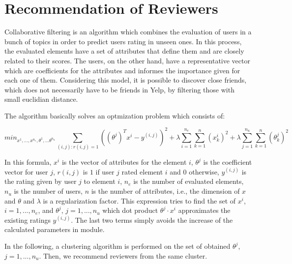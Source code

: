 \section{Recommendation of Reviewers}
Collaborative filtering is an algorithm which combines the evaluation of
users in a bunch of topics in order to predict users rating in unseen ones. In
this process, the evaluated elements have a set of attributes that define them
and are closely related to their scores. The users, on the other hand, have a
representative vector which are coefficients for the attributes and informes the
importance given for each one of them. Considering this model, it is possible to
discover close friends, which does not necessarily have to be friends in Yelp,
by filtering those with small euclidian distance.

The algorithm basically solves an optmization problem which consists of:

\[
min_{x^1,...,x^{n_e},\theta^1,...\theta^{n_u}}
  \sum_{(i,j):r(i,j)=1} ((\theta^j)^T x^i - y^{(i,j)})^2 +
  \lambda \sum_{i=1}^{n_e} \sum_{k=1}^{n} (x_k^i)^2 +
  \lambda \sum_{j=1}^{n_u} \sum_{k=1}^{n} (\theta_k^j)^2
\]

In this formula, $x^i$ is the vector of attributes for the element $i$,
$\theta^j$ is the coefficient vector for user $j$, $r(i,j)$ is $1$ if user $j$
rated element $i$ and $0$ otherwise, $y^{(i,j)}$ is the rating given by user $j$
to element $i$, $n_e$ is the number of evaluated elements, $n_u$ is the number
of users, $n$ is the number of attributes, i.e., the dimension of $x$ and
$\theta$ and $\lambda$ is a regularization factor. This expression tries to find
the set of $x^i$, $i=1,...,n_e$, and $\theta^j$, $j=1,...,n_u$ which dot product
$\theta^j \cdot x^i$ approximates the existing ratings $y^{(i,j)}$. The last two
terms simply avoids the increase of the calculated parameters in module.

In the following, a clustering algorithm is performed on the set of obtained
$\theta^j$, $j=1,...,n_u$. Then, we recommend reviewers from the same cluster.
